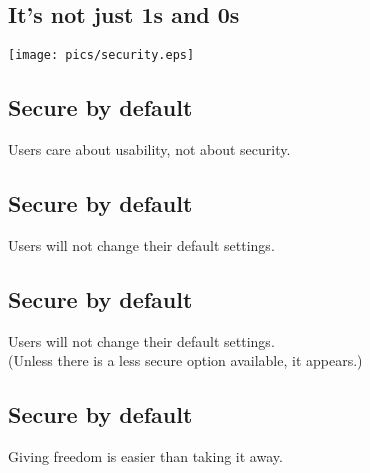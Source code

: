 \documentclass[xga]{xdvislides}
\begin{document}
\subsection{It's not just 1s and 0s}
\vspace*{\fill}
\begin{center}
	\texttt{[image: pics/security.eps]}
\end{center}
\vspace*{\fill}



\subsection{Secure by default}
\vspace{.5in}
\Huge
\begin{center}
Users care about usability, not about security.
\end{center}
\Normalsize

\subsection{Secure by default}
\vspace{.5in}
\Huge
\begin{center}
Users will not change their default settings.
\end{center}
\Normalsize

\subsection{Secure by default}
\vspace{.5in}
\Huge
\begin{center}
Users will not change their default settings. \\
\Normalsize
(Unless there is a less secure option available, it appears.)
\end{center}

\subsection{Secure by default}
\vspace{.5in}
\Huge
\begin{center}
Giving freedom is easier than taking it away. \\
\end{center}
\Normalsize
\end{document}
